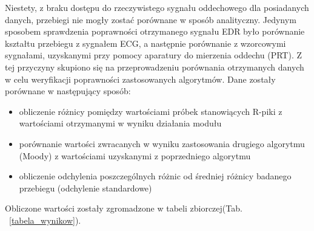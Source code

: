 		Niestety, z braku dostępu do rzeczywistego sygnału oddechowego dla posiadanych danych, przebiegi nie mogły zostać porównane w sposób analityczny. Jedynym sposobem sprawdzenia poprawności otrzymanego sygnału EDR było porównanie kształtu przebiegu z sygnałem ECG, a następnie porównanie z wzorcowymi sygnałami, uzyskanymi przy pomocy aparatury do mierzenia oddechu (PRT). Z tej przyczyny skupiono się na przeprowadzeniu porównania otrzymanych danych w celu weryfikacji poprawności zastosowanych algorytmów.
	   \newpage
		Dane zostały porównane w następujący sposób:
		\begin{itemize}
		\item obliczenie różnicy pomiędzy wartościami próbek stanowiących R-piki z wartościami                                   otrzymanymi w wyniku działania modułu
		\item porównanie wartości zwracanych w wyniku zastosowania drugiego algorytmu (Moody) z                               wartościami uzyskanymi z poprzedniego algorytmu
		\item obliczenie odchylenia poszczególnych różnic od średniej różnicy badanego przebiegu                          (odchylenie standardowe)
		\end{itemize}
	   
		Obliczone wartości zostały zgromadzone w tabeli zbiorczej(Tab. ~\ref{tabela_wynikow}). \newline
 
